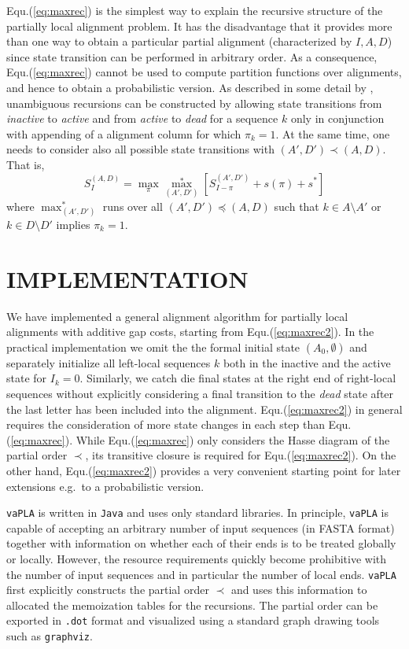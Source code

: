 \documentclass[a4paper,10pt]{article}
\newcommand{\TODO}[1]{\begingroup\color{red}#1\endgroup}
\newcommand{\SAFTWARE}{\texttt{vaPLA}} %
\begin{document}
Equ.(\ref{eq:maxrec}) is the simplest way to explain the recursive
structure of the partially local alignment problem. It has the disadvantage
that it provides more than one way to obtain a particular partial alignment
(characterized by $I,A,D$) since state transition can be performed in
arbitrary order. As a consequence, Equ.(\ref{eq:maxrec}) cannot be used to
compute partition functions over alignments, and hence to obtain a
probabilistic version. As described in some detail by \citet{Retzlaff:18a},
unambiguous recursions can be constructed by allowing state transitions
from \textit{inactive} to \textit{active} and from \textit{active} to
\textit{dead} for a sequence $k$ only in conjunction with appending of a
alignment column for which $\pi_k=1$.  At the same time, one needs to
consider also all possible state transitions with $(A',D')\prec(A,D)$. That
is,
\begin{equation}
  S^{(A,D)}_I = 
  \displaystyle\max_{\pi} \displaystyle\max_{(A',D')}^*
  \left[ S^{(A',D')}_{I-\pi} + s(\pi) + s^* \right]
  \label{eq:maxrec2}
\end{equation}
where $\max_{(A',D')}^*$ runs over all $(A',D')\preceq(A,D)$ such that
$k\in A\setminus A'$ or $k\in D\setminus D'$ implies $\pi_k=1$.

\section{\uppercase{Implementation}}

We have implemented a general alignment algorithm for partially local
alignments with additive gap costs, starting from
Equ.(\ref{eq:maxrec2}). In the practical implementation we omit the the
formal initial state $(A_0,\emptyset)$ and separately initialize all
left-local sequences $k$ both in the inactive and the active state for
$I_k=0$. Similarly, we catch die final states at the right end of
right-local sequences without explicitly considering a final transition to
the \textit{dead} state after the last letter has been included into the
alignment. Equ.(\ref{eq:maxrec2}) in general requires the consideration of
more state changes in each step than Equ.(\ref{eq:maxrec}). While
Equ.(\ref{eq:maxrec}) only considers the Hasse diagram of the partial
order $\prec$, its transitive closure is required for
Equ.(\ref{eq:maxrec2}). On the other hand, Equ.(\ref{eq:maxrec2}) provides
a very convenient starting point for later extensions e.g.\ to a
probabilistic version. 

\SAFTWARE{} is written in \texttt{Java} and uses only standard libraries.
In principle, \SAFTWARE{} is capable of accepting an arbitrary number of
input sequences (in FASTA format) together with information on whether
  each of their ends is to be treated globally or locally. However, the
resource requirements quickly become prohibitive with the number of input
sequences and in particular the number of local ends. \SAFTWARE{} first
explicitly constructs the partial order $\prec$ and uses this information
to allocated the memoization tables for the recursions. The partial order
can be exported in \texttt{.dot} format and visualized using a standard
graph drawing tools such as \texttt{graphviz}.
\end{document}
